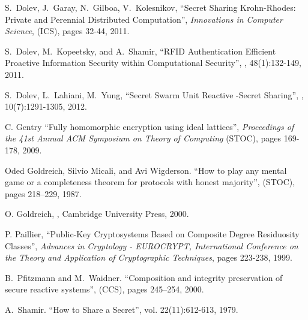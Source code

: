 \documentclass[letterpaper,11pt]{article}
\begin{document}
{\begin{thebibliography}{99}
S.\ Dolev, J.\ Garay, N.\ Gilboa, V.\ Kolesnikov,
``Secret Sharing Krohn-Rhodes: Private and Perennial Distributed Computation'',
{\it Innovations in Computer Science}, (ICS), pages 32-44, 2011.

 S.\ Dolev, M.\ Kopeetsky, and A.\ Shamir,
\newblock ``RFID Authentication Efficient Proactive Information Security within Computational Security'',
, 48(1):132-149, 2011.


 S.\ Dolev, L.\ Lahiani, M.\ Yung,
\newblock ``Secret Swarm Unit Reactive -Secret Sharing'',
, 10(7):1291-1305, 2012.



C. Gentry ``Fully homomorphic encryption using ideal lattices'', {\it Proceedings of the 41st Annual ACM Symposium on Theory of Computing} (STOC), pages 169-178, 2009.

Oded Goldreich, Silvio Micali, and Avi Wigderson.
\newblock ``How to play any mental game or a completeness theorem for protocols
  with honest majority'',
 (STOC), pages 218--229, 1987.

 O. Goldreich,
, Cambridge University Press, 2000.

 P. Paillier, ``Public-Key Cryptosystems Based on Composite Degree Residuosity Classes'', \textit{Advances in Cryptology - EUROCRYPT, International Conference on the Theory and Application of Cryptographic Techniques}, pages 223-238, 1999.


B.\ Pfitzmann and M.\ Waidner.
\newblock ``Composition and integrity preservation of secure reactive systems'',
 (CCS), pages 245--254, 2000.


 A.\ Shamir. 
\newblock ``How to Share a Secret'',
 vol. 22(11):612-613, 1979.



\end{thebibliography}

} 
\appendix
\end{document}
